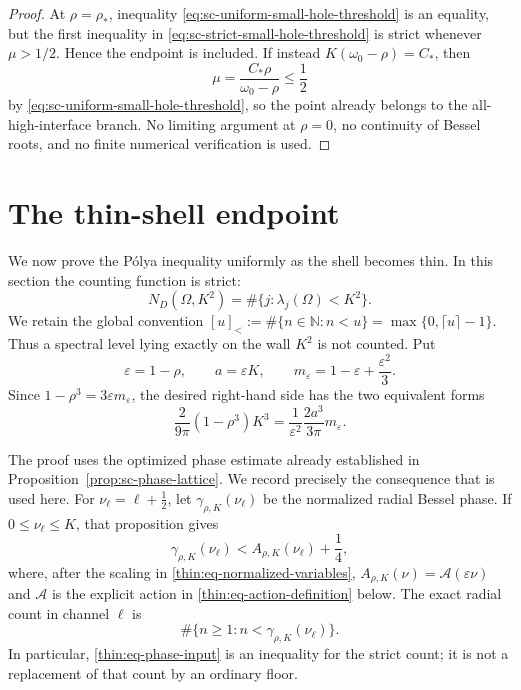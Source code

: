 \documentclass[11pt]{article}
\numberwithin{equation}{section}
\theoremstyle{definition}
\theoremstyle{remark}
\begin{document}
\begin{proof}
At \(\rho=\rho_*\), inequality
\eqref{eq:sc-uniform-small-hole-threshold} is an equality, but the first
inequality in \eqref{eq:sc-strict-small-hole-threshold} is strict whenever
\(\mu>1/2\).  Hence the endpoint is included.  If instead
\(K(\omega_0-\rho)=C_*\), then
\[
  \mu=\frac{C_*\rho}{\omega_0-\rho}\le\frac12
\]
by \eqref{eq:sc-uniform-small-hole-threshold}, so the point already belongs
to the all-high-interface branch.  No limiting argument at \(\rho=0\), no
continuity of Bessel roots, and no finite numerical verification is used.
\end{proof}

\section{The thin-shell endpoint}
\label{thin:sec-endpoint}

We now prove the P\'olya inequality uniformly as the shell becomes thin.  In
this section the counting function is strict:
\[
  N_D(\Omega,K^2)=\#\{j:\lambda_j(\Omega)<K^2\}.
\]
We retain the global convention
\([u]_<:=\#\{n\in\mathbb N:n<u\}=\max\{0,\lceil u\rceil-1\}\).
Thus a spectral level lying exactly on the wall \(K^2\) is not counted.  Put
\begin{equation}
  \varepsilon=1-\rho,
  \qquad a=\varepsilon K,
  \qquad
  m_\varepsilon=1-\varepsilon+\frac{\varepsilon^2}{3}.
  \label{thin:eq-normalized-variables}
\end{equation}
Since \(1-\rho^3=3\varepsilon m_\varepsilon\), the desired right-hand side
has the two equivalent forms
\begin{equation}
  \frac{2}{9\pi}(1-\rho^3)K^3
  =\frac{1}{\varepsilon^2}\frac{2a^3}{3\pi}m_\varepsilon.
  \label{thin:eq-weyl-normalization}
\end{equation}

The proof uses the optimized phase estimate already established in
Proposition~\ref{prop:sc-phase-lattice}.  We record precisely the consequence
that is used here.  For
\(\nu_\ell=\ell+\tfrac12\), let
\(\gamma_{\rho,K}(\nu_\ell)\) be the normalized radial Bessel phase.  If
\(0\leq\nu_\ell\leq K\), that proposition gives
\begin{equation}
  \gamma_{\rho,K}(\nu_\ell)
  < A_{\rho,K}(\nu_\ell)+\frac14,
  \label{thin:eq-phase-input}
\end{equation}
where, after the scaling in \eqref{thin:eq-normalized-variables},
\(A_{\rho,K}(\nu)=\mathcal A(\varepsilon\nu)\) and
\(\mathcal A\) is the explicit action in
\eqref{thin:eq-action-definition} below.  The exact radial count in channel
\(\ell\) is
\begin{equation}
  \#\{n\geq1:n<\gamma_{\rho,K}(\nu_\ell)\}.
  \label{thin:eq-exact-phase-count}
\end{equation}
In particular, \eqref{thin:eq-phase-input} is an inequality for the strict
count; it is not a replacement of that count by an ordinary floor.
\end{document}
